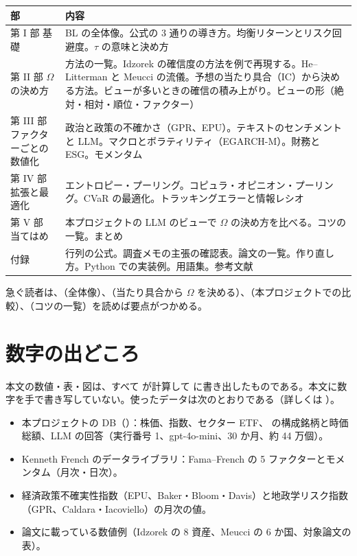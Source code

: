 \begin{center}
\small
\begin{tabular}{p{2.4cm}p{11.2cm}}
\toprule
部 & 内容 \\
\midrule
第 I 部 基礎 & BL の全体像。公式の 3 通りの導き方。均衡リターンとリスク回避度。$\tau$ の意味と決め方 \\
第 II 部 $\Omega$ の決め方 & 方法の一覧。Idzorek の確信度の方法を例で再現する。He--Litterman と Meucci の流儀。予想の当たり具合（IC）から決める方法。ビューが多いときの確信の積み上がり。ビューの形（絶対・相対・順位・ファクター） \\
第 III 部 ファクターごとの数値化 & 政治と政策の不確かさ（GPR、EPU）。テキストのセンチメントと LLM。マクロとボラティリティ（EGARCH-M）。財務と ESG。モメンタム \\
第 IV 部 拡張と最適化 & エントロピー・プーリング。コピュラ・オピニオン・プーリング。CVaR の最適化。トラッキングエラーと情報レシオ \\
第 V 部 当てはめ & 本プロジェクトの LLM のビューで $\Omega$ の決め方を比べる。コツの一覧。まとめ \\
付録 & 行列の公式。調査メモの主張の確認表。論文の一覧。作り直し方。Python での実装例。用語集。参考文献 \\
\bottomrule
\end{tabular}
\end{center}

急ぐ読者は、（全体像）、（当たり具合から $\Omega$ を決める）、（本プロジェクトでの比較）、（コツの一覧）を読めば要点がつかめる。

\section*{数字の出どころ}

本文の数値・表・図は、すべて  が計算して  に書き出したものである。本文に数字を手で書き写していない。使ったデータは次のとおりである（詳しくは ）。

\begin{itemize}
\item 本プロジェクトの DB（）：株価、指数、セクター ETF、\SP{} の構成銘柄と時価総額、LLM の回答（実行番号 1、gpt-4o-mini、30 か月、約 44 万個）。
\item Kenneth French のデータライブラリ：Fama--French の 5 ファクターとモメンタム（月次・日次）。
\item 経済政策不確実性指数（EPU、Baker・Bloom・Davis）と地政学リスク指数（GPR、Caldara・Iacoviello）の月次の値。
\item 論文に載っている数値例（Idzorek の 8 資産、Meucci の 6 か国、対象論文の表）。
\end{itemize}

